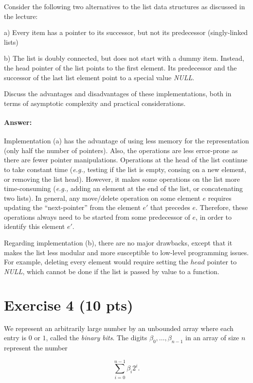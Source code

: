 \documentclass[a4paper]{article}
\newcommand{\eg}{\emph{e.g.,} }
\begin{document}
Consider the following two alternatives to the list data structures as discussed in the lecture:

a) Every item has a pointer to its successor, but not its predecessor (singly-linked lists)

b) The list is doubly connected, but does not start with a dummy item. Instead, the head
pointer of the list points to the first element. Its predecessor and the successor of the last list element point to a special value \emph{NULL}.

\bigskip Discuss the advantages and disadvantages of these implementations, both in terms of asymptotic complexity and practical considerations.

\paragraph{Answer:}

Implementation (a) has the advantage of using less memory for the representation (only half the number of pointers).
Also, the operations are less error-prone as there are fewer pointer manipulations.
Operations at the head of the list continue to take constant time (\eg testing if the list is empty, consing on a new element, or removing the list head).
However, it makes some operations on the list more time-consuming (\eg adding an element at the end of the list, or concatenating two lists).
In general, any move/delete operation on some element $e$ requires updating the ``next-pointer'' from the element $e'$ that precedes $e$.
Therefore, these operations always need to be started from some predecessor of $e$, in order to identify this element $e'$.

Regarding implementation (b), there are no major drawbacks, except that it makes the list less modular and more susceptible to low-level programming issues. For example, deleting every element would require setting the $head$ pointer to \emph{NULL}, which cannot be done if the list is passed by value to a function.

\section{Exercise 4 (10 pts)}

We represent an arbitrarily large number by an unbounded array where each entry is $0$ or $1$, called the \emph{binary bits}. The digits $\beta_0, \ldots, \beta_{n-1}$ in an array of size $n$ represent the number

$$\sum\limits_{i=0}^{n-1} \beta_i 2^i.$$
\end{document}
